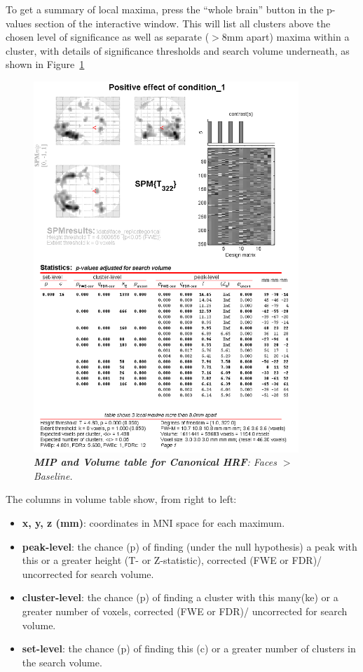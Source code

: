 To get a summary of local maxima, press the ``whole brain'' button in the p-values section of the interactive window. This will list all clusters above the chosen level of significance as well as separate ($>$8mm apart) maxima within a cluster, with details of significance thresholds and search volume underneath, as shown in Figure~\ref{cat5_volume}
\begin{figure}
\begin{center}
\includegraphics[width=100mm]{faces/cat5_volume}
\caption{\em \textbf{MIP and Volume table for Canonical HRF}: Faces  $>$ Baseline. \label{cat5_volume} }
\end{center}
\end{figure}

The columns in volume table show, from right to left:
\begin{itemize}
\item \textbf{x, y, z (mm)}: coordinates in MNI space for each maximum.
\item \textbf{peak-level}: the chance (p) of finding (under the null hypothesis) a peak with this or a greater height (T- or Z-statistic), corrected (FWE or FDR)/ uncorrected for search volume.
\item \textbf{cluster-level}: the chance (p) of finding a cluster with this many(ke) or a greater number of voxels, corrected (FWE or FDR)/ uncorrected for search volume.
\item \textbf{set-level}: the chance (p) of finding this (c) or a greater number of clusters in the search volume.
\end{itemize}


